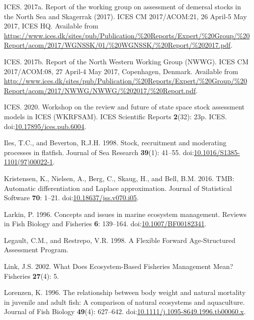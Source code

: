 \documentclass[]{article}
\begin{document}
\leavevmode\hypertarget{ref-ices2017Report}{}%
ICES. 2017a. Report of the working group on assessment of demersal
stocks in the North Sea and Skagerrak (2017). ICES CM 2017/ACOM:21, 26
April-5 May 2017, ICES HQ. Available from
\url{https://www.ices.dk/sites/pub/Publication/\%20Reports/Expert/\%20Group/\%20Report/acom/2017/WGNSSK/01/\%20WGNSSK/\%20Report/\%202017.pdf}.

\leavevmode\hypertarget{ref-ices2017Reporta}{}%
ICES. 2017b. Report of the North Western Working Group (NWWG). ICES CM
2017/ACOM:08, 27 April-4 May 2017, Copenhagen, Denmark. Available from
\url{http://www.ices.dk/sites/pub/Publication/\%20Reports/Expert/\%20Group/\%20Report/acom/2017/NWWG/NWWG/\%202017/\%20Report.pdf}.

\leavevmode\hypertarget{ref-ices2020Workshop}{}%
ICES. 2020. Workshop on the review and future of state space stock
assessment models in ICES (WKRFSAM). ICES Scientific Reports
\textbf{2}(32): 23p. ICES.
doi:\href{https://doi.org/10.17895/ices.pub.6004}{10.17895/ices.pub.6004}.

\leavevmode\hypertarget{ref-iles1998Stock}{}%
Iles, T.C., and Beverton, R.J.H. 1998. Stock, recruitment and moderating
processes in flatfish. Journal of Sea Research \textbf{39}(1): 41--55.
doi:\href{https://doi.org/10.1016/S1385-1101(97)00022-1}{10.1016/S1385-1101(97)00022-1}.

\leavevmode\hypertarget{ref-kristensen2016TMB}{}%
Kristensen, K., Nielsen, A., Berg, C., Skaug, H., and Bell, B.M. 2016.
TMB: Automatic differentiation and Laplace approximation. Journal of
Statistical Software \textbf{70}: 1--21.
doi:\href{https://doi.org/10.18637/jss.v070.i05}{10.18637/jss.v070.i05}.

\leavevmode\hypertarget{ref-larkin1996Concepts}{}%
Larkin, P. 1996. Concepts and issues in marine ecosystem management.
Reviews in Fish Biology and Fisheries \textbf{6}: 139--164.
doi:\href{https://doi.org/10.1007/BF00182341}{10.1007/BF00182341}.

\leavevmode\hypertarget{ref-legault1998Flexible}{}%
Legault, C.M., and Restrepo, V.R. 1998. A Flexible Forward
Age-Structured Assessment Program.

\leavevmode\hypertarget{ref-link2002What}{}%
Link, J.S. 2002. What Does Ecosystem-Based Fisheries Management Mean?
Fisheries \textbf{27}(4): 5.

\leavevmode\hypertarget{ref-lorenzen1996Relationship}{}%
Lorenzen, K. 1996. The relationship between body weight and natural
mortality in juvenile and adult fish: A comparison of natural ecosystems
and aquaculture. Journal of Fish Biology \textbf{49}(4): 627--642.
doi:\href{https://doi.org/10.1111/j.1095-8649.1996.tb00060.x}{10.1111/j.1095-8649.1996.tb00060.x}.
\end{document}
